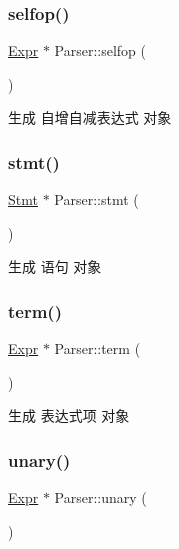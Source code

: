 \subsubsection{\texorpdfstring{selfop()}{selfop()}}
{\footnotesize\ttfamily \hyperlink{class_expr}{Expr} $\ast$ Parser\+::selfop (\begin{DoxyParamCaption}{ }\end{DoxyParamCaption})\hspace{0.3cm}{\ttfamily [protected]}}



生成 自增自减表达式 对象 

\mbox{\label{class_parser_ab1ae72a37dbe2118ab65ad8f4dec4630}} 
\subsubsection{\texorpdfstring{stmt()}{stmt()}}
{\footnotesize\ttfamily \hyperlink{class_stmt}{Stmt} $\ast$ Parser\+::stmt (\begin{DoxyParamCaption}{ }\end{DoxyParamCaption})\hspace{0.3cm}{\ttfamily [protected]}}



生成 语句 对象 

\mbox{\label{class_parser_a3809fe1d71ccaf111e4c6dc57f86640f}} 
\subsubsection{\texorpdfstring{term()}{term()}}
{\footnotesize\ttfamily \hyperlink{class_expr}{Expr} $\ast$ Parser\+::term (\begin{DoxyParamCaption}{ }\end{DoxyParamCaption})\hspace{0.3cm}{\ttfamily [protected]}}



生成 表达式项 对象 

\mbox{\label{class_parser_ac58cd88a976f4a7d147f5f815724f6a6}} 
\subsubsection{\texorpdfstring{unary()}{unary()}}
{\footnotesize\ttfamily \hyperlink{class_expr}{Expr} $\ast$ Parser\+::unary (\begin{DoxyParamCaption}{ }\end{DoxyParamCaption})\hspace{0.3cm}{\ttfamily [protected]}}




